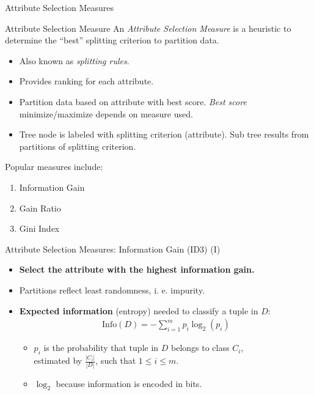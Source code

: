 \begin{frame}{Attribute Selection Measures}
	\begin{block}{Attribute Selection Measure}
		An \textit{Attribute Selection Measure} is a heuristic to determine the ``best'' splitting criterion to partition data.
	\end{block}

	\begin{itemize}
		\item Also known as \textit{splitting rules}.
		\item Provides ranking for each attribute.
		\item Partition data based on attribute with best score. \textit{Best score} minimize/maximize depends on measure used.
		\item Tree node is labeled with splitting criterion (attribute). Sub tree results from partitions of splitting criterion.
	\end{itemize}

	Popular measures include:
	\begin{enumerate}
		\item Information Gain
		\item Gain Ratio
		\item Gini Index
	\end{enumerate}
\end{frame}

\begin{frame}{Attribute Selection Measures: Information Gain (ID3) (I)}
	\begin{itemize}
		\item \textbf{Select the attribute with the highest information gain.}
		\item Partitions reflect least randomness, i. e. impurity.
		\item \textbf{Expected information} (entropy) needed to classify a tuple in $D$:
		      \begin{align*}
			      \text{Info}(D) = -\sum_{i=1}^{m}p_i \log_2(p_i)
		      \end{align*}

		      \begin{itemize}
			      \item $p_i$ is the probability that tuple in $D$ belongs to class $C_i$,\\
			            estimated by $\frac{|C_i|}{|D|}$, such that $1 \leq i \leq m$.
			      \item $\log_2$ because information is encoded in bits.
		      \end{itemize}
	\end{itemize}
\end{frame}

